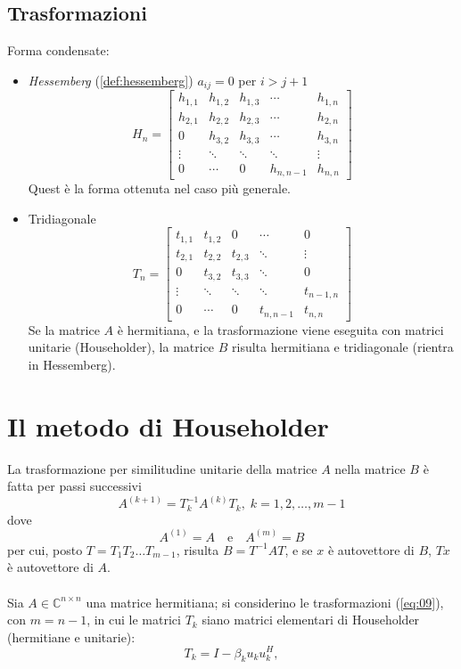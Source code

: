 \subsection{Trasformazioni}
Forma condensate:
\begin{itemize}
\item \emph{Hessemberg} (\ref{def:hessemberg})
  $ a_{ij} = 0$ per $i > j+1$
  $$
  H_n = \begin{bmatrix}
    h_{1,1} & h_{1,2} & h_{1,3} & \cdots    & h_{1,n} \\
    h_{2,1} & h_{2,2} & h_{2,3} & \cdots    & h_{2,n} \\
    0       & h_{3,2} & h_{3,3} & \cdots    & h_{3,n} \\
    \vdots  & \ddots  & \ddots  & \ddots    & \vdots  \\
    0       & \cdots  & 0       & h_{n,n-1} & h_{n,n}
  \end{bmatrix}
  $$
Quest è la forma ottenuta nel caso più generale.

\item Tridiagonale
  $$
  T_n = \begin{bmatrix}
    t_{1,1} & t_{1,2} & 0 & \cdots  & 0 \\
    t_{2,1} & t_{2,2} & t_{2,3} & \ddots  & \vdots  \\
    0       & t_{3,2} & t_{3,3} & \ddots  & 0 \\
    \vdots  & \ddots  & \ddots  & \ddots  & t_{n-1,n}  \\
    0       & \cdots  & 0     & t_{n,n-1} & t_{n,n}
  \end{bmatrix}
  $$
Se la matrice $A$ è hermitiana, e la trasformazione viene eseguita con
matrici unitarie (Householder), la matrice $B$ risulta hermitiana e
tridiagonale (rientra in Hessemberg).
\end{itemize}

\section{Il metodo di Householder}
La trasformazione per similitudine unitarie della matrice $A$ nella matrice $B$
\`e fatta per passi successivi
\begin{equation}
  \label{eq:09}
  A^{(k+1)} = T^{-1}_k A^{(k)} T_k,\;  k = 1, 2, \ldots , m-1
\end{equation}
dove
$$ A^{(1)}=A \quad \text{e} \quad A^{(m)}=B$$
per cui, posto $T = T_1 T_2 \ldots T_{m-1}$, risulta $B = T^{-1} AT$,
e se $x$ \`e autovettore  di $B$, $T x$ \`e autovettore di $A$.
\\ \\
Sia $A \in \mathbb{C}^{n \times n}$ una matrice hermitiana;
si considerino le trasformazioni (\ref{eq:09}), con $m = n-1$,
in cui le matrici $T_k$ siano matrici elementari di Householder
(hermitiane e unitarie):
$$T_k= I − \beta_k u_k u_k^{H} ,$$

